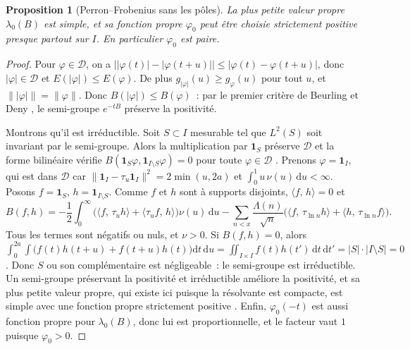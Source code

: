 \documentclass[11pt,a4paper]{article}
\newtheorem{proposition}[theoreme]{Proposition}
\theoremstyle{definition}
\theoremstyle{remark}
\newcommand{\dd}{\mathrm{d}}
\newcommand{\ps}[2]{\langle #1,\,#2\rangle}
\begin{document}
\begin{proposition}[Perron--Frobenius sans les pôles]\label{prop:PF}
La plus petite valeur propre $\lambda_0(B)$ est simple, et sa fonction propre $\varphi_0$ peut être choisie strictement
positive presque partout sur $I$. En particulier $\varphi_0$ est paire.
\end{proposition}
\begin{proof}
Pour $\varphi\in\mathcal D$, on a $\bigl||\varphi(t)|-|\varphi(t+u)|\bigr|\le|\varphi(t)-\varphi(t+u)|$, donc
$|\varphi|\in\mathcal D$ et $E(|\varphi|)\le E(\varphi)$. De plus $g_{|\varphi|}(u)\ge g_\varphi(u)$ pour tout $u$, et
$\||\varphi|\|=\|\varphi\|$. Donc $B(|\varphi|)\le B(\varphi)$~: par le premier critère de Beurling et Deny
\cite[§XIII.12]{reedsimon}, le semi-groupe $e^{-tB}$ préserve la positivité.

Montrons qu'il est irréductible. Soit $S\subset I$ mesurable tel que $L^2(S)$ soit invariant par le semi-groupe. Alors la
multiplication par $\mathbf 1_S$ préserve $\mathcal D$ et la forme bilinéaire vérifie $B(\mathbf 1_S\varphi,\mathbf 1_{I\setminus S}\varphi)=0$
pour toute $\varphi\in\mathcal D$ \cite[chap.~2]{ouhabaz}. Prenons $\varphi=\mathbf 1_I$, qui est dans $\mathcal D$ car
$\|\mathbf 1_I-\tau_u\mathbf 1_I\|^2=2\min(u,2a)$ et $\int_0^1u\,\nu(u)\,\dd u<\infty$. Posons $f=\mathbf 1_S$,
$h=\mathbf 1_{I\setminus S}$. Comme $f$ et $h$ sont à supports disjoints, $\ps fh=0$ et
\[
B(f,h)=-\frac12\int_0^\infty\bigl(\ps{f}{\tau_uh}+\ps{\tau_uf}{h}\bigr)\nu(u)\,\dd u
-\sum_{n<x}\frac{\Lambda(n)}{\sqrt n}\bigl(\ps{f}{\tau_{\ln n}h}+\ps{h}{\tau_{\ln n}f}\bigr).
\]
Tous les termes sont négatifs ou nuls, et $\nu>0$. Si $B(f,h)=0$, alors
$\int_0^{2a}\!\int\bigl(f(t)h(t+u)+f(t+u)h(t)\bigr)\dd t\,\dd u=\iint_{I\times I}f(t)h(t')\,\dd t\,\dd t'=|S|\cdot|I\setminus S|=0$.
Donc $S$ ou son complémentaire est négligeable~: le semi-groupe est irréductible. Un semi-groupe préservant la positivité et
irréductible améliore la positivité, et sa plus petite valeur propre, qui existe ici puisque la résolvante est compacte, est
simple avec une fonction propre strictement positive \cite[§XIII.12]{reedsimon}. Enfin, $\varphi_0(-t)$ est
aussi fonction propre pour $\lambda_0(B)$, donc lui est proportionnelle, et le facteur vaut $1$ puisque $\varphi_0>0$.
\end{proof}
\end{document}
